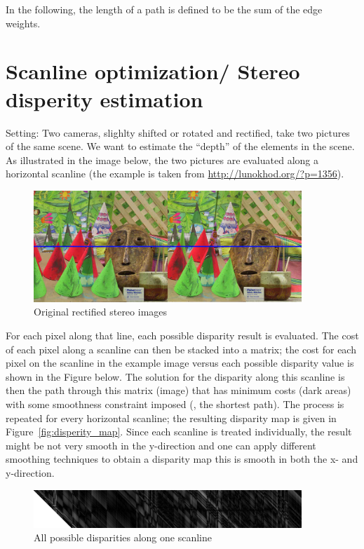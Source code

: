 In the following, the length of a path is defined to be the sum of the
edge weights.


\section{Scanline optimization/ Stereo disperity estimation}
Setting: Two cameras, slighlty shifted or rotated and rectified, take
two pictures of the same scene. We want to estimate the ``depth'' of
the elements in the scene. As illustrated in the image below, the two
pictures are evaluated along a horizontal scanline (the example is
taken from \url{http://lunokhod.org/?p=1356}).

\begin{figure}[h!]
  \centering
  \includegraphics[width=0.9\textwidth]{Figures/input_imagery_and_scanline}
  \caption{Original rectified stereo images}
\end{figure}
For each pixel along that line, each possible disparity result is
evaluated. The cost of each pixel along a scanline can then be stacked
into a matrix; the cost for each pixel on the scanline in the example
image versus each possible disparity value is shown in the Figure
below. The solution for the disparity along this scanline is then the
path through this matrix (image) that has minimum costs (dark areas)
with some smoothness constraint imposed (\ie, the shortest path). The
process is repeated for every horizontal scanline; the resulting
disparity map is given in Figure~\ref{fig:disperity_map}. Since each
scanline is treated individually, the result might be not very smooth
in the y-direction and one can apply different smoothing techniques to
obtain a disparity map this is smooth in both the x- and y-direction.

\begin{figure}[h!]
  \centering
  \includegraphics[width=0.9\textwidth]{Figures/scanline_costs}
  \caption{All possible disparities along one scanline}
\end{figure}



